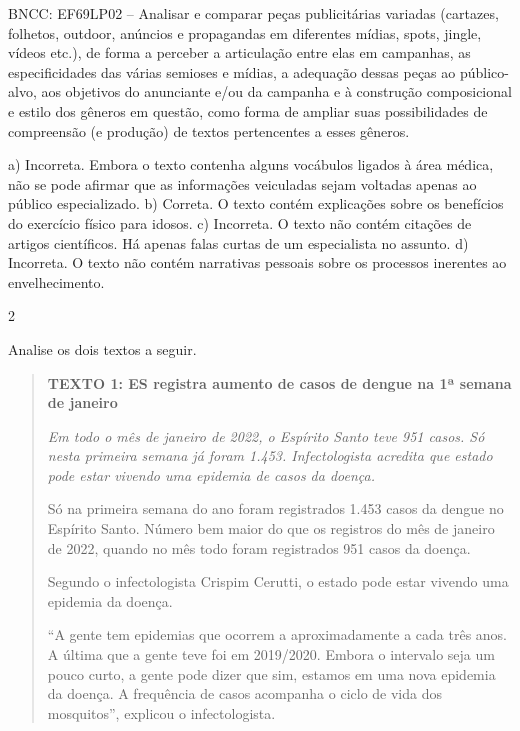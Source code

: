 {{BNCC: EF69LP02 -- Analisar e comparar peças publicitárias variadas
(cartazes, folhetos, outdoor, anúncios e propagandas em diferentes
mídias, spots, jingle, vídeos etc.), de forma a perceber a articulação
entre elas em campanhas, as especificidades das várias semioses e
mídias, a adequação dessas peças ao público-alvo, aos objetivos do
anunciante e/ou da campanha e à construção composicional e estilo dos
gêneros em questão, como forma de ampliar suas possibilidades de
compreensão (e produção) de textos pertencentes a esses gêneros.

a) Incorreta. Embora o texto contenha alguns vocábulos ligados à área médica, não se pode 
afirmar que as informações veiculadas sejam voltadas apenas ao público especializado.
b) Correta. O texto contém explicações sobre os benefícios do exercício físico para idosos.
c) Incorreta. O texto não contém citações de artigos científicos. Há apenas falas curtas de um
especialista no assunto.
d) Incorreta. O texto não contém narrativas pessoais sobre os processos inerentes ao envelhecimento.}

\num{2}

Analise os dois textos a seguir.

\begin{quote}

\textbf{TEXTO 1: ES registra aumento de casos de dengue na 1ª semana de janeiro}

\textit{Em todo o mês de janeiro de 2022, o Espírito Santo teve 951
casos. Só nesta primeira semana já foram 1.453. Infectologista acredita
que estado pode estar vivendo uma epidemia de casos da doença.}

Só na primeira semana do ano foram registrados 1.453 casos da dengue no
Espírito Santo. Número bem maior do que os registros do mês de janeiro
de 2022, quando no mês todo foram registrados 951 casos da doença.

Segundo o infectologista Crispim Cerutti, o estado pode estar vivendo
uma epidemia da doença.

``A gente tem epidemias que ocorrem a aproximadamente a cada três anos. A
última que a gente teve foi em 2019/2020. Embora o intervalo seja um
pouco curto, a gente pode dizer que sim, estamos em uma nova epidemia da
doença. A frequência de casos acompanha o ciclo de vida dos mosquitos'',
explicou o infectologista.

\end{quote}


}
